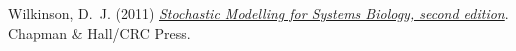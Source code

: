 \documentclass[mathserif,handout]{beamer}
\begin{document}
{\begin{thebibliography}{}
\beamertemplatebookbibitems


Wilkinson, D.~J. (2011)
 {\em \alert{\href{http://tinyurl.com/smfsb2e}{Stochastic Modelling for Systems Biology, second edition}}}.
 Chapman \& Hall/CRC Press.

\end{thebibliography}

\medskip






}
\end{document}
